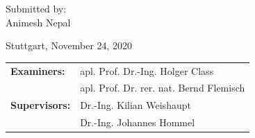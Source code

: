 \vspace{5cm}

\begin{center}
  {\normalsize Submitted by:}\\[0.1cm]
  {\large Animesh Nepal}\\[0.1cm]
\end{center}

\vspace{3cm}

\begin{center}
  {\large Stuttgart, November 24, 2020}
\end{center}

\vspace{0.5cm}

\begin{center}
  {\large 
  \begin{tabular}{ll}
  \textbf{Examiners:}& apl. Prof. Dr.-Ing. Holger Class\\ & apl. Prof. Dr. rer. nat. Bernd Flemisch\\
  \textbf{Supervisors:}& Dr.-Ing. Kilian Weishaupt\\ & Dr.-Ing. Johannes Hommel
  \end{tabular}
  }\\[0.1cm]
\end{center}

\endinput